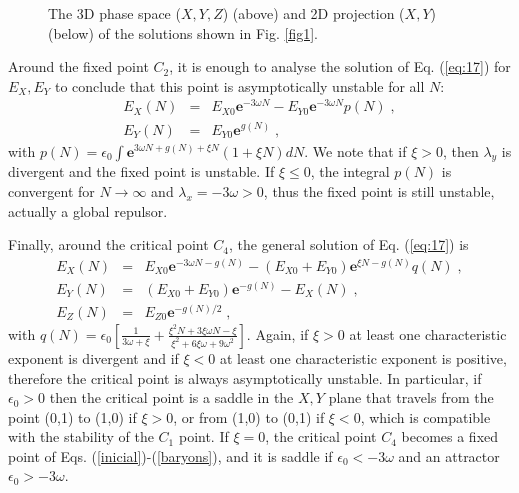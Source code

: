 \documentclass[twocolumn,preprintnumbers,amsmath,amssymb]{revtex4}
\begin{document}
\begin{figure*}
\centerline{%
} %
\vspace{0.5cm}
\centerline{%
}
\caption{The 3D phase space ($X,Y,Z$) (above) and 2D projection ($X,Y$) (below) of the solutions shown in Fig. \ref{fig1}.}
\label{fig2}
\end{figure*}

Around the fixed point $C_{2}$, it is enough to analyse the solution
of Eq. (\ref{eq:17}) for $E_{X},E_{Y}$ to conclude that this point is 
asymptotically unstable for all $N$:
\begin{eqnarray*}
E_{X}(N) & = & E_{X0}\mathbf{e}^{-3\omega N}-E_{Y0}\mathbf{e}^{-3\omega N}p(N)\;,\\
E_{Y}(N) & = & E_{Y0}\mathbf{e}^{g(N)}\;,
\end{eqnarray*}
with ${\displaystyle p(N)=\epsilon_{0}\int\mathbf{e}^{3\omega N+g(N)+\xi N}\left(1+\xi N\right)dN}$.
We note that if $\xi>0$, then $\lambda_{y}$ is divergent and the
fixed point is unstable. If $\xi\leq0$, the integral $p(N)$ is convergent for 
$N\rightarrow\infty$ and $\lambda_{x}=-3\omega>0$,
thus the fixed point is still unstable, actually a global repulsor.  

Finally, around the critical point $C_{4}$, the general solution
of Eq. (\ref{eq:17}) is
\begin{eqnarray*}
E_{X}(N) & = & E_{X0}\mathbf{e}^{-3\omega N-g(N)}-(E_{X0}+E_{Y0})\mathbf{e}^{\xi N-g(N)}q(N)\;,\\
E_{Y}(N) & = & (E_{X0}+E_{Y0})\mathbf{e}^{-g(N)}-E_{X}(N)\;,\\
E_{Z}(N) & = & E_{Z0}\mathbf{e}^{-g(N)/2}\;,
\end{eqnarray*}
with ${\displaystyle q(N)=\epsilon_{0}\left[\frac{1}{3\omega+\xi}+\frac{\xi^{2}N+3\xi\omega N-\xi}{\xi^{2}+6\xi\omega+9\omega^{2}}\right]}$. Again, if $\xi>0$ at least one characteristic exponent is divergent and if $\xi<0$ at least one characteristic exponent is positive,
therefore the critical point is always asymptotically unstable. In particular, if
$\epsilon_{0}>0$ then the critical point is a saddle in the $X,Y$
plane that travels from the point (0,1) to (1,0) if $\xi>0$, or from
(1,0) to (0,1) if $\xi<0$, which is compatible with 
the stability of the $C_{1}$ point. If $\xi=0$, the critical point $C_{4}$
becomes a fixed point of Eqs. (\ref{inicial})-(\ref{baryons}), and it
is saddle if $\epsilon_{0}<-3\omega$ and an attractor $\epsilon_{0}>-3\omega$.
\end{document}
